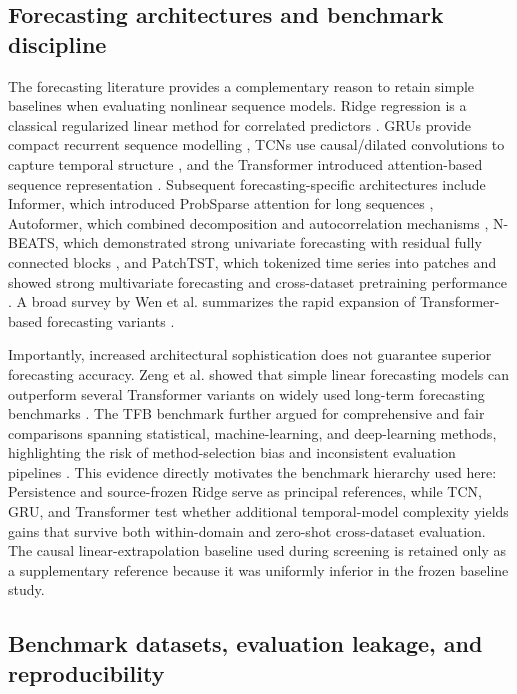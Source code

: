 \documentclass[preprint,12pt]{elsarticle}
\begin{document}
\subsection{Forecasting architectures and benchmark discipline}

The forecasting literature provides a complementary reason to retain simple baselines when evaluating nonlinear sequence models. Ridge regression is a classical regularized linear method for correlated predictors \cite{Hoerl1970Ridge}. GRUs provide compact recurrent sequence modelling \cite{Cho2014GRU}, TCNs use causal/dilated convolutions to capture temporal structure \cite{Bai2018TCN}, and the Transformer introduced attention-based sequence representation \cite{Vaswani2017Attention}. Subsequent forecasting-specific architectures include Informer, which introduced ProbSparse attention for long sequences \cite{Zhou2021Informer}, Autoformer, which combined decomposition and autocorrelation mechanisms \cite{Wu2021Autoformer}, N-BEATS, which demonstrated strong univariate forecasting with residual fully connected blocks \cite{Oreshkin2020NBEATS}, and PatchTST, which tokenized time series into patches and showed strong multivariate forecasting and cross-dataset pretraining performance \cite{Nie2023PatchTST}. A broad survey by Wen et al. summarizes the rapid expansion of Transformer-based forecasting variants \cite{Wen2023TSTransformers}.

Importantly, increased architectural sophistication does not guarantee superior forecasting accuracy. Zeng et al. showed that simple linear forecasting models can outperform several Transformer variants on widely used long-term forecasting benchmarks \cite{Zeng2023Transformers}. The TFB benchmark further argued for comprehensive and fair comparisons spanning statistical, machine-learning, and deep-learning methods, highlighting the risk of method-selection bias and inconsistent evaluation pipelines \cite{Qiu2024TFB}. This evidence directly motivates the benchmark hierarchy used here: Persistence and source-frozen Ridge serve as principal references, while TCN, GRU, and Transformer test whether additional temporal-model complexity yields gains that survive both within-domain and zero-shot cross-dataset evaluation. The causal linear-extrapolation baseline used during screening is retained only as a supplementary reference because it was uniformly inferior in the frozen baseline study.

\subsection{Benchmark datasets, evaluation leakage, and reproducibility}
\end{document}
